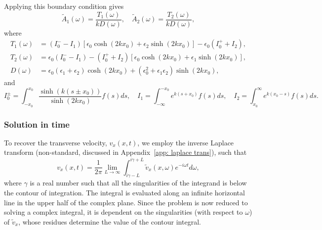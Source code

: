\documentclass{aastex61}
\begin{document}
Applying this boundary condition gives
\begin{equation}
\tilde{A}_1(\omega) = \frac{T_1(\omega)}{k D(\omega)}, \quad \tilde{A}_2(\omega) = \frac{T_2(\omega)}{k D(\omega)},
\end{equation}
where
\begin{align}
T_1(\omega) & = (I_0^- - I_1)[\epsilon_0\cosh(2kx_0) + \epsilon_2\sinh(2kx_0)] - \epsilon_0(I_0^+ + I_2), \\
T_2(\omega) & = \epsilon_0(I_0^- - I_1) - (I_0^+ + I_2)[\epsilon_0\cosh(2kx_0) + \epsilon_1\sinh(2kx_0)], \\
D(\omega) & = \epsilon_0(\epsilon_1 + \epsilon_2)\cosh(2kx_0) + (\epsilon_0^2 + \epsilon_1\epsilon_2)\sinh(2kx_0),
\label{D incomp}
\end{align}
and
\begin{equation}
I_0^\pm = \int_{-x_0}^{x_0} \frac{\sinh(k(s \pm x_0))}{\sinh(2kx_0)} f(s) ds,
\quad
I_1 = \int_{-\infty}^{-x_0} e^{k(s + x_0)} f(s) ds,
\quad
I_2 = \int_{x_0}^\infty e^{k(x_0 - s)} f(s) ds.
\end{equation}


























\subsubsection{Solution in time}

To recover the transverse velocity, $v_x(x, t)$, we employ the inverse Laplace transform (non-standard, discussed in Appendix~\ref{app: laplace trans}), such that
\begin{equation}
v_x(x,t) = \frac{1}{2\pi} \lim_{L \to \infty} \int_{i\gamma - L}^{i\gamma + L} \tilde{v}_x(x,\omega) e^{-i\omega t} d\omega,
\end{equation}
where $\gamma$ is a real number such that all the singularities of the integrand is below the contour of integration. The integral is evaluated along an infinite horizontal line in the upper half of the complex plane. Since the problem is now reduced to solving a complex integral, it is dependent on the singularities (with respect to $\omega$) of $\tilde{v}_x$, whose residues determine the value of the contour integral.
\end{document}

